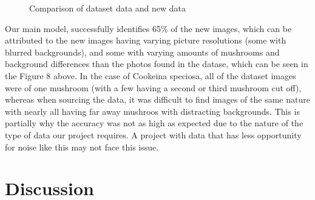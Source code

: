 \documentclass{article} %
\begin{document}
\FloatBarrier
\begin{figure}[h]
    \centering
    \hfill
    \caption{Comparison of dataset data and new data}
    \label{fig:sideBySideGraphs}
\end{figure}
\FloatBarrier

Our main model, successfully identifies 65\% of the new images, which can be attributed to the new images having varying picture resolutions (some with blurred backgrounds), and some with varying amounts of mushrooms and background differences than the photos found in the datase, which can be seen in the Figure 8 above. In the case of Cookeina speciosa, all of the dataset images were of one mushroom (with a few having a second or third mushroom cut off), whereas when sourcing the data, it was difficult to find images of the same nature with nearly all having far away mushroos with distracting backgrounds. This is partially why the accuracy was not as high as expected due to the nature of the type of data our project requires. A project with data that has less opportunity for noise like this may not face this issue.

\section{Discussion}
\label{sec:discussion}
\end{document}
